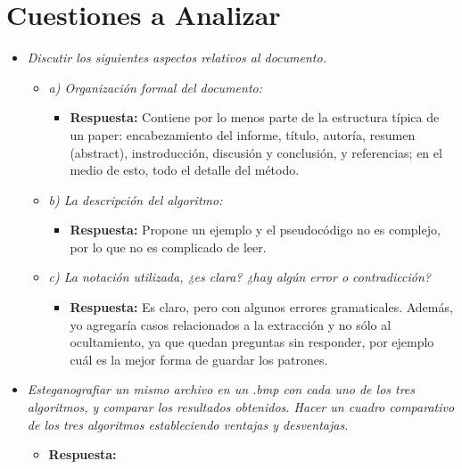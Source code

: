 \documentclass[a4paper,12pt]{article}
\begin{document}
	\newpage
	
	\section{Cuestiones a Analizar}
	
	\begin{itemize}
		\item \textit{Discutir los siguientes aspectos relativos al documento.}
		\begin{itemize}
			\item \textit{a) Organización formal del documento:}
			\begin{itemize}
				\item \textbf{Respuesta:} Contiene por lo menos parte de la estructura típica de un paper: encabezamiento del informe, título, autoría, resumen (abstract), instroducción, discusión y conclusión, y referencias; en el medio de esto, todo el detalle del método. 
			\end{itemize}
			
			\item \textit{b) La descripción del algoritmo:}
			\begin{itemize}
				\item \textbf{Respuesta:} Propone un ejemplo y el pseudocódigo no es complejo, por lo que no es complicado de leer.
			\end{itemize}
			
			\item \textit{c) La notación utilizada, ¿es clara? ¿hay algún error o contradicción?}
			\begin{itemize}
				\item \textbf{Respuesta:} Es claro, pero con algunos errores gramaticales. Además, yo agregaría casos relacionados a la extracción y no sólo al ocultamiento, ya que quedan preguntas sin responder, por ejemplo cuál es la mejor forma de guardar los patrones. 
			\end{itemize}
		\end{itemize}
		
		\item \textit{Esteganografiar un mismo archivo en un .bmp con cada uno de los tres algoritmos, y comparar los resultados obtenidos. Hacer un cuadro comparativo de los tres algoritmos estableciendo ventajas y desventajas.}
		\begin{itemize}
			\item \textbf{Respuesta:} 
			

\end{itemize}
\end{itemize}
\end{document}
